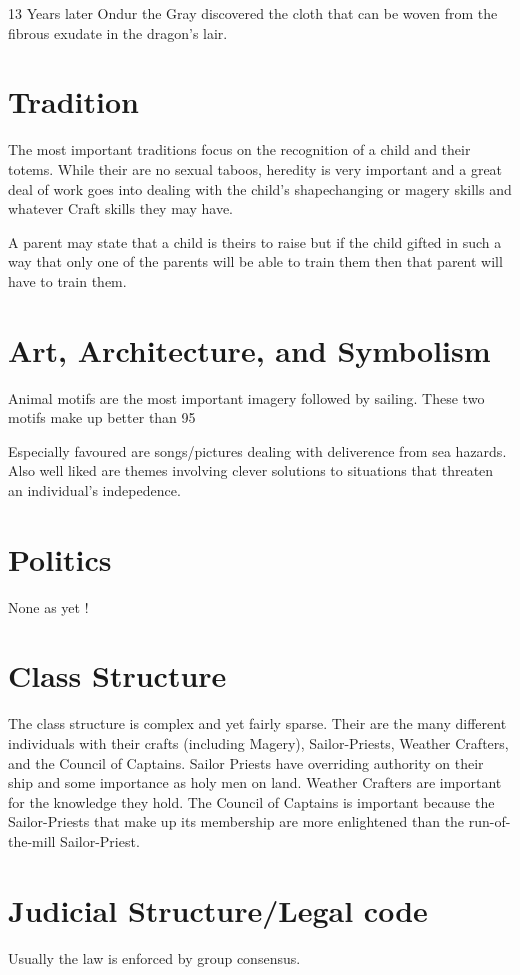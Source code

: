 13 Years later Ondur the Gray discovered the cloth that can be woven from 
the fibrous exudate in the dragon's lair.

\section{Tradition}

The most important traditions focus on the recognition of a child and their totems.
While their are no sexual taboos, heredity is very important and a great deal of work 
goes into dealing with the child's shapechanging or magery skills and whatever
Craft skills they may have. 

A parent may state that a child is theirs to raise but if the child gifted in
such a way that only one of the parents will be able to train them then that parent
will have to train them. 

\section{Art, Architecture, and Symbolism}

Animal motifs are the most important imagery followed by sailing. 
These two motifs make up better than 95%

Especially favoured are songs/pictures dealing with deliverence 
from sea hazards. Also well liked are themes involving clever 
solutions to situations that threaten an individual's indepedence.

\section{Politics}

None as yet !

\section{Class Structure}

The class structure is complex and yet fairly sparse. Their are the many different 
individuals with their crafts (including Magery), Sailor-Priests, Weather Crafters,
and the Council of Captains. Sailor Priests have overriding authority on their ship
and some importance as holy men on land. Weather Crafters are important for the 
knowledge they hold. The Council of Captains is important because the Sailor-Priests 
that make up its membership are more enlightened than the run-of-the-mill 
Sailor-Priest.

\section{Judicial Structure/Legal code}

Usually the law is enforced by group consensus. 


